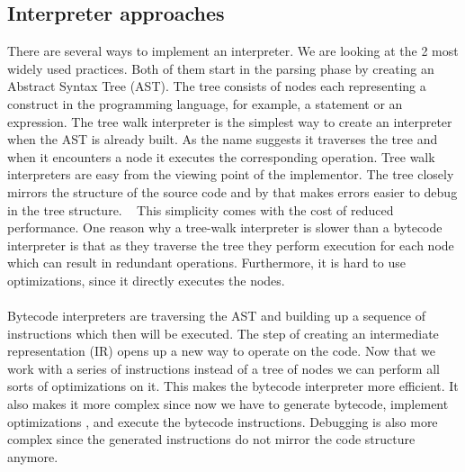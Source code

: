 \documentclass{article}
\begin{document}
\subsection{Interpreter approaches}
There are several ways to implement an interpreter. We are looking
at the 2 most widely used practices. 
Both of them start in the parsing phase by creating an Abstract Syntax
Tree (AST). The tree consists of nodes each representing a construct in
the programming language, for example, a statement or an expression. 
The tree walk interpreter is the simplest way to create an interpreter when the
AST is already built. As the name suggests it traverses the tree and when it
encounters a node it executes the corresponding operation. Tree walk
interpreters are easy from the viewing point of the implementor. The tree
closely mirrors the structure of the source code and by that makes errors
easier to debug in the tree structure. ~\cite{bebic}
This simplicity comes with the cost of reduced performance. One reason why a
tree-walk interpreter is slower than a bytecode interpreter is that as they
traverse the tree they perform execution for each node which can result in
redundant operations. Furthermore, it is hard to use optimizations, since
it directly executes the nodes. ~\cite{bebic}
\\\\
Bytecode interpreters are traversing the AST and building up a sequence of
instructions which then will be executed. The step of creating an intermediate
representation (IR) opens up a new way to operate on the code. Now that we work
with a series of instructions instead of a tree of nodes we can perform all
sorts of optimizations on it. This makes the bytecode interpreter more
efficient. It also makes it more complex since now we have to generate
bytecode, implement optimizations , and execute the bytecode instructions.
Debugging is also more complex since the generated instructions do not mirror
the code structure anymore. ~\cite{bebic}
\end{document}
